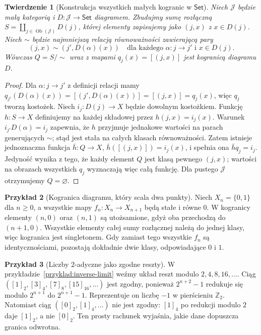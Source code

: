 \documentclass[11pt,a4paper]{article}
\numberwithin{equation}{section}
\theoremstyle{plain}
\newtheorem{twierdzenie}{Twierdzenie}[section]
\theoremstyle{definition}
\newtheorem{przyklad}[twierdzenie]{Przykład}
\theoremstyle{remark}
\newcommand{\cat}[1]{\mathsf{#1}}
\newcommand{\Set}{\cat{Set}}
\newcommand{\Ob}{\operatorname{Ob}}
\begin{document}
\begin{twierdzenie}[Konstrukcja wszystkich małych kogranic w $\Set$]\label{tw:colimits-set}
Niech $\mathcal J$ będzie małą kategorią i $D:\mathcal J\to\Set$ diagramem. Zbudujmy sumę rozłączną $S=\coprod_{j\in\Ob(\mathcal J)}D(j)$, której elementy zapisujemy jako $(j,x)$ z $x\in D(j)$. Niech $\sim$ będzie najmniejszą relacją równoważności zawierającą pary
\[
(j,x)\sim(j',D(\alpha)(x))\quad \text{dla każdego }\alpha:j\to j'\text{ i }x\in D(j).
\]
Wówczas $Q=S/{\sim}$ wraz z mapami $q_j(x)=[(j,x)]$ jest kogranicą diagramu $D$.
\end{twierdzenie}
\begin{proof}
Dla $\alpha:j\to j'$ z definicji relacji mamy $q_{j'}(D(\alpha)(x))=[(j',D(\alpha)(x))]=[(j,x)]=q_j(x)$, więc $q_j$ tworzą kostożek. Niech $i_j:D(j)\to X$ będzie dowolnym kostożkiem. Funkcję $h:S\to X$ definiujemy na każdej składowej przez $h(j,x)=i_j(x)$. Warunek $i_{j'}D(\alpha)=i_j$ zapewnia, że $h$ przyjmuje jednakowe wartości na parach generujących $\sim$; stąd jest stała na całych klasach równoważności. Zatem istnieje jednoznaczna funkcja $\bar h:Q\to X$, $\bar h([(j,x)])=i_j(x)$, i spełnia ona $\bar hq_j=i_j$. Jedyność wynika z tego, że każdy element $Q$ jest klasą pewnego $(j,x)$; wartości na obrazach wszystkich $q_j$ wyznaczają więc całą funkcję. Dla pustego $\mathcal J$ otrzymujemy $Q=\varnothing$.
\end{proof}

\begin{przyklad}[Kogranica diagramu, który scala dwa punkty]
Niech $X_n=\{0,1\}$ dla $n\geq0$, a wszystkie mapy $f_n:X_n\to X_{n+1}$ będą stałe i równe $0$. W kogranicy elementy $(n,0)$ oraz $(n,1)$ są utożsamione, gdyż oba przechodzą do $(n+1,0)$. Wszystkie elementy całej sumy rozłącznej należą do jednej klasy, więc kogranica jest singletonem. Gdy zamiast tego wszystkie $f_n$ są identycznościami, pozostają dokładnie dwie klasy, odpowiadające $0$ i $1$.
\end{przyklad}

\begin{przyklad}[Liczby $2$-adyczne jako zgodne reszty]
W przykładzie~\ref{przyklad:inverse-limit} weźmy układ reszt modulo $2,4,8,16,\ldots$. Ciąg $([1]_2,[3]_4,[7]_8,[15]_{16},\ldots)$ jest zgodny, ponieważ $2^{n+2}-1$ redukuje się modulo $2^{n+1}$ do $2^{n+1}-1$. Reprezentuje on liczbę $-1$ w pierścieniu $\mathbb Z_2$. Natomiast ciąg $([0]_2,[1]_4,\ldots)$ nie jest zgodny: $[1]_4$ po redukcji modulo $2$ daje $[1]_2$, a nie $[0]_2$. Ten prosty rachunek wyjaśnia, jakie dane dopuszcza granica odwrotna.
\end{przyklad}
\end{document}
